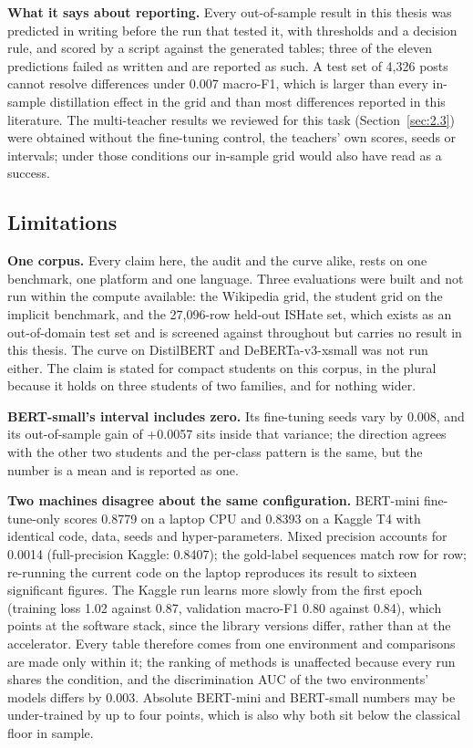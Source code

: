 \textbf{What it says about reporting.} Every out-of-sample result in this thesis was predicted in
writing before the run that tested it, with thresholds and a decision rule, and scored by a script
against the generated tables; three of the eleven predictions failed as written and are reported as
such. A test set of 4,326 posts cannot resolve differences under 0.007 macro-F1, which is larger
than every in-sample distillation effect in the grid and than most differences reported in this
literature. The multi-teacher results we reviewed for this task (Section~\ref{sec:2.3}) were
obtained without the fine-tuning control, the teachers' own scores, seeds or intervals; under those
conditions our in-sample grid would also have read as a success.
\subsection{Limitations}
\label{sec:7.1}
\textbf{One corpus.} Every claim here, the audit and the curve alike, rests on one benchmark, one
platform and one language. Three evaluations were built and not run within the compute available:
the Wikipedia grid, the student grid on the implicit benchmark, and the 27,096-row held-out ISHate
set, which exists as an out-of-domain test set and is screened against throughout but carries no
result in this thesis. The curve on DistilBERT and DeBERTa-v3-xsmall was not run either. The claim
is stated for compact students on this corpus, in the plural because it holds on three students of
two families, and for nothing wider.

\textbf{BERT-small's interval includes zero.} Its fine-tuning seeds vary by 0.008, and its
out-of-sample gain of +0.0057 sits inside that variance; the direction agrees with the other two
students and the per-class pattern is the same, but the number is a mean and is reported as one.

\textbf{Two machines disagree about the same configuration.} BERT-mini fine-tune-only scores 0.8779
on a laptop CPU and 0.8393 on a Kaggle T4 with identical code, data, seeds and hyper-parameters.
Mixed precision accounts for 0.0014 (full-precision Kaggle: 0.8407); the gold-label sequences match
row for row; re-running the current code on the laptop reproduces its result to sixteen significant
figures. The Kaggle run learns more slowly from the first epoch (training loss 1.02 against 0.87,
validation macro-F1 0.80 against 0.84), which points at the software stack, since the library
versions differ, rather than at the accelerator. Every table therefore comes from one environment
and comparisons are made only within it; the ranking of methods is unaffected because every run
shares the condition, and the discrimination AUC of the two environments' models differs by 0.003.
Absolute BERT-mini and BERT-small numbers may be under-trained by up to four points, which is also
why both sit below the classical floor in sample.

